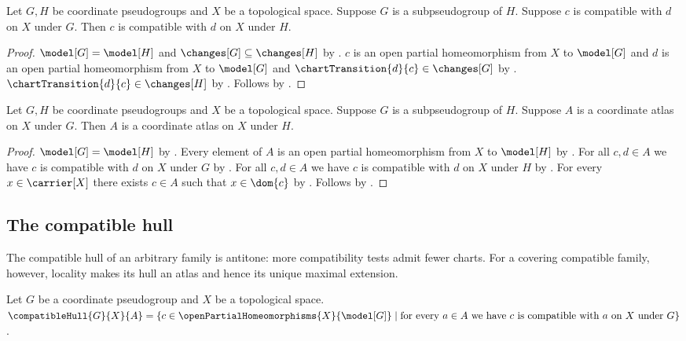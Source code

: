 \begin{theorem}\label{subpseudogroup_compatibility}
    Let $G,H$ be coordinate pseudogroups and $X$ be a topological space.
    Suppose $G$ is a subpseudogroup of $H$.
    Suppose $c$ is compatible with $d$ on $X$ under $G$.
    Then $c$ is compatible with $d$ on $X$ under $H$.
\end{theorem}
\begin{proof}
    $\model[G]=\model[H]$ and $\changes[G]\subseteq\changes[H]$ by
        .
    $c$ is an open partial homeomorphism from $X$ to $\model[G]$ and
        $d$ is an open partial homeomorphism from $X$ to $\model[G]$ and
        $\chartTransition{d}{c}\in\changes[G]$ by .
    $\chartTransition{d}{c}\in\changes[H]$ by .
    Follows by .
\end{proof}

\begin{classification}\label{subpseudogroup_atlas}
    Let $G,H$ be coordinate pseudogroups and $X$ be a topological space.
    Suppose $G$ is a subpseudogroup of $H$.
    Suppose $A$ is a coordinate atlas on $X$ under $G$.
    Then $A$ is a coordinate atlas on $X$ under $H$.
\end{classification}
\begin{proof}
    $\model[G]=\model[H]$ by .
    Every element of $A$ is an open partial homeomorphism from $X$ to $\model[H]$ by
        .
    For all $c,d\in A$ we have $c$ is compatible with $d$ on $X$ under $G$ by
        .
    For all $c,d\in A$ we have $c$ is compatible with $d$ on $X$ under $H$ by
        .
    For every $x\in\carrier[X]$ there exists $c\in A$ such that $x\in\dom{c}$ by
        .
    Follows by .
\end{proof}

\subsection{The compatible hull}

The compatible hull of an arbitrary family is antitone: more compatibility
tests admit fewer charts. For a covering compatible family, however, locality
makes its hull an atlas and hence its unique maximal extension.

\begin{definition}\label{compatible_hull}
    Let $G$ be a coordinate pseudogroup and $X$ be a topological space.
    $\compatibleHull{G}{X}{A}=\{c\in\openPartialHomeomorphisms{X}{\model[G]}\mid
        \text{for every $a\in A$ we have $c$ is compatible with $a$ on $X$ under $G$}\}$.
\end{definition}

